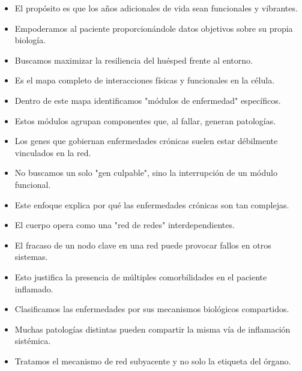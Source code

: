 \begin{itemize}
    \item El propósito es que los años adicionales de vida sean funcionales y vibrantes.
    \item Empoderamos al paciente proporcionándole datos objetivos sobre su propia biología.
    \item Buscamos maximizar la resiliencia del huésped frente al entorno.
\end{itemize}

\begin{itemize}
    \item Es el mapa completo de interacciones físicas y funcionales en la célula.
    \item Dentro de este mapa identificamos "módulos de enfermedad" específicos.
    \item Estos módulos agrupan componentes que, al fallar, generan patologías.
\end{itemize}

\begin{itemize}
    \item Los genes que gobiernan enfermedades crónicas suelen estar débilmente vinculados en la red.
    \item No buscamos un solo "gen culpable", sino la interrupción de un módulo funcional.
    \item Este enfoque explica por qué las enfermedades crónicas son tan complejas.
\end{itemize}

\begin{itemize}
    \item El cuerpo opera como una "red de redes" interdependientes.
    \item El fracaso de un nodo clave en una red puede provocar fallos en otros sistemas.
    \item Esto justifica la presencia de múltiples comorbilidades en el paciente inflamado.
\end{itemize}

\begin{itemize}
    \item Clasificamos las enfermedades por sus mecanismos biológicos compartidos.
    \item Muchas patologías distintas pueden compartir la misma vía de inflamación sistémica.
    \item Tratamos el mecanismo de red subyacente y no solo la etiqueta del órgano.
\end{itemize}

